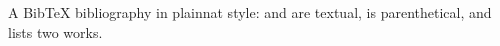 \documentclass{article}
\begin{document}
A BibTeX bibliography in plainnat style: \citet{knuth84} and
\citet{plass81} are textual, \citep{hammer14} is parenthetical, and
\citep{knuth84,lamport94} lists two works.



\end{document}

